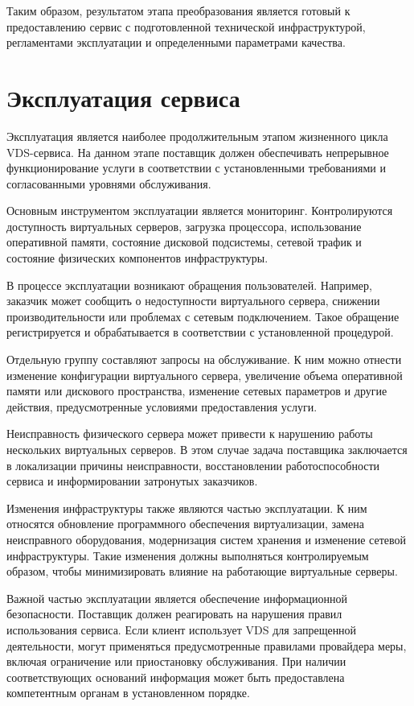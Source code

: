 \documentclass[14pt,a4paper]{extarticle}
\begin{document}
    Таким образом, результатом этапа преобразования является готовый к
    предоставлению сервис с подготовленной технической инфраструктурой,
    регламентами эксплуатации и определенными параметрами качества.

    \section{Эксплуатация сервиса}

    Эксплуатация является наиболее продолжительным этапом жизненного цикла
    VDS-сервиса. На данном этапе поставщик должен обеспечивать непрерывное
    функционирование услуги в соответствии с установленными требованиями и
    согласованными уровнями обслуживания.

    Основным инструментом эксплуатации является мониторинг. Контролируются
    доступность виртуальных серверов, загрузка процессора, использование
    оперативной памяти, состояние дисковой подсистемы, сетевой трафик и состояние
    физических компонентов инфраструктуры.

    В процессе эксплуатации возникают обращения пользователей. Например, заказчик
    может сообщить о недоступности виртуального сервера, снижении
    производительности или проблемах с сетевым подключением. Такое обращение
    регистрируется и обрабатывается в соответствии с установленной процедурой.

    Отдельную группу составляют запросы на обслуживание. К ним можно отнести
    изменение конфигурации виртуального сервера, увеличение объема оперативной
    памяти или дискового пространства, изменение сетевых параметров и другие
    действия, предусмотренные условиями предоставления услуги.

    Неисправность физического сервера может привести к нарушению работы нескольких
    виртуальных серверов. В этом случае задача поставщика заключается в локализации
    причины неисправности, восстановлении работоспособности сервиса и
    информировании затронутых заказчиков.

    Изменения инфраструктуры также являются частью эксплуатации. К ним относятся
    обновление программного обеспечения виртуализации, замена неисправного
    оборудования, модернизация систем хранения и изменение сетевой инфраструктуры.
    Такие изменения должны выполняться контролируемым образом, чтобы минимизировать
    влияние на работающие виртуальные серверы.

    Важной частью эксплуатации является обеспечение информационной безопасности.
    Поставщик должен реагировать на нарушения правил использования сервиса. Если
    клиент использует VDS для запрещенной деятельности, могут применяться
    предусмотренные правилами провайдера меры, включая ограничение или приостановку
    обслуживания. При наличии соответствующих оснований информация может быть
    предоставлена компетентным органам в установленном порядке.
\end{document}
